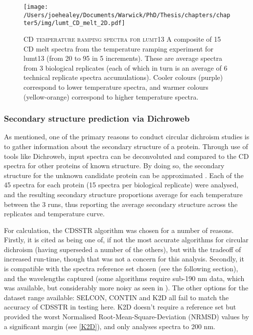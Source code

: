 \begin{figure}[p]
	\centering
	\texttt{[image: /Users/joehealey/Documents/Warwick/PhD/Thesis/chapters/chapter5/img/lumt\_CD\_melt\_2D.pdf]}
	\captionsetup{singlelinecheck=off, justification=justified, font=footnotesize, aboveskip=10pt}
	\caption[lumt13 CD melt plot]{\textsc{\normalsize CD temperature ramping spectra for lumt13}\vspace{0.1cm} \newline A composite of 15 CD melt spectra from the temperature ramping experiment for lumt13 (from 20\degC{} to 95\degC{} in 5\degC{} increments). These are average spectra from 3 biological replicates (each of which in turn is an average of 6 technical replicate spectra accumulations). Cooler colours (purple) correspond to lower temperature spectra, and warmer colours (yellow-orange) correspond to higher temperature spectra.}
	\label{lumtmelt}
\end{figure}

\subsubsection{Secondary structure prediction via Dichroweb}
As mentioned, one of the primary reasons to conduct circular dichroism studies is to gather information about the secondary structure of a protein. Through use of tools like Dichroweb, input spectra can be deconvoluted and compared to the CD spectra for other proteins of known structure. By doing so, the secondary structure for the unknown candidate protein can be approximated \citep{Whitmore2004, Lobley2002}. Each of the 45 spectra for each protein (15 spectra per biological replicate) were analysed, and the resulting secondary structure proportions average for each temperature between the 3 runs, thus reporting the average secondary structure across the replicates and temperature curve.

For calculation, the CDSSTR algorithm \citep{Compton1986,Sreerama2000b, Manavalan1987} was chosen for a number of reasons. Firstly, it is cited as being one of, if not the most accurate algorithms for circular dichroism (having superseded a number of the others), but with the tradeoff of increased run-time, though that was not a concern for this analysis. Secondly, it is compatible with the spectra reference set chosen (see the following section), and the wavelengths captured (some algorithms require sub-190 nm data, which was available, but considerably more noisy as seen in ). The other options for the dataset range available: SELCON, CONTIN and K2D all fail to match the accuracy of CDSSTR in testing here. K2D doesn't require a reference set but provided the worst Normalised Root-Mean-Square-Deviation (NRMSD) values by a significant margin (see \vref{K2D}), and only analyses spectra to 200 nm.

